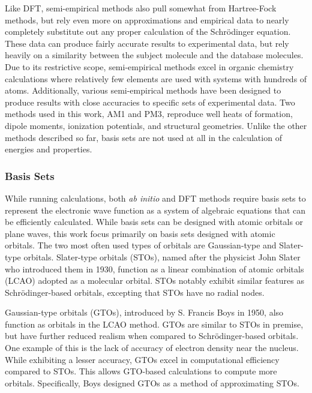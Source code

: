 Like DFT, semi-empirical methods also pull somewhat from Hartree-Fock methods, but rely even more on approximations and empirical data to nearly completely substitute out any proper calculation of the Schr\"{o}dinger equation.
These data can produce fairly accurate results to experimental data, but rely heavily on a similarity between the subject molecule and the database molecules.
Due to its restrictive scope, semi-empirical methods excel in organic chemistry calculations where relatively few elements are used with systems with hundreds of atoms.\cite{huckel}
Additionally, various semi-empirical methods have been designed to produce results with close accuracies to specific sets of experimental data.
Two methods used in this work, AM1\cite{AM1} and PM3,\cite{PM3} reproduce well heats of formation, dipole moments, ionization potentials, and structural geometries.
Unlike the other methods described so far, basis sets are not used at all in the calculation of energies and properties.

\subsubsection{Basis Sets}

While running calculations, both \textit{ab initio} and DFT methods require basis sets to represent the electronic wave function as a system of algebraic equations that can be efficiently calculated.
While basis sets can be designed with atomic orbitals or plane waves, this work focus primarily on basis sets designed with atomic orbitals.
The two most often used types of orbitals are Gaussian-type and Slater-type orbitals.
Slater-type orbitals (STOs), named after the physicist John Slater who introduced them in 1930,\cite{SlaterOrbitals} function as a linear combination of atomic orbitals (LCAO) adopted as a molecular orbital. 
STOs notably exhibit similar features as Schr\"{o}dinger-based orbitals, excepting that STOs have no radial nodes.

Gaussian-type orbitals (GTOs), introduced by S. Francis Boys in 1950,\cite{GaussianOrbitals} also function as orbitals in the LCAO method.
GTOs are similar to STOs in premise, but have further reduced realism when compared to Schr\"{o}dinger-based orbitals.
One example of this is the lack of accuracy of electron density near the nucleus.
While exhibiting a lesser accuracy, GTOs excel in computational efficiency compared to STOs.
This allows GTO-based calculations to compute more orbitals.
Specifically, Boys designed GTOs as a method of approximating STOs.

